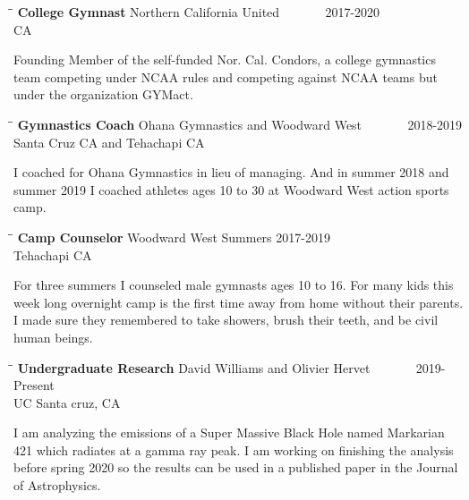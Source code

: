 \documentclass{res}
\begin{document}
\begin{resume}
   \begin{tabbing}
   \hspace{2.3in}\= \hspace{2.6in}\= \kill %
    {\bf College Gymnast} \>Northern California United \> ~~~~~~ 2017-2020\\
                          \>CA
   \end{tabbing}\vspace{-20pt}
    Founding Member of the self-funded Nor. Cal. Condors, a college gymnastics team 			competing under NCAA rules and competing against NCAA teams but under the 					organization GYMact.
    
   \begin{tabbing}%
   \hspace{2.3in}\= \hspace{2.6in}\= \kill %
   {\bf Gymnastics Coach}  \>Ohana Gymnastics and Woodward West \> ~~~~~~ 2018-2019\\
                          \>Santa Cruz CA and Tehachapi CA
   \end{tabbing}\vspace{-20pt}
    I coached for Ohana  Gymnastics in lieu of managing. And in summer 2018 and summer 			2019 I coached athletes ages 10 to 30 at Woodward West action sports camp.   
    
   \begin{tabbing}%
   \hspace{2.3in}\= \hspace{2.6in}\= \kill %
   {\bf Camp Counselor}  \>Woodward West \> Summers 2017-2019\\
                          \>Tehachapi CA
   \end{tabbing}\vspace{-20pt}
    For three summers I counseled male gymnasts ages 10 to 16. For many kids this week 			long overnight camp is the first time away from home without their parents. I made 			sure they remembered to take showers, brush their teeth, and be civil human beings.

\begin{tabbing}%
   \hspace{2.3in}\= \hspace{2.6in}\= \kill %
   {\bf Undergraduate Research}  \>David Williams and Olivier Hervet \> ~~~~~~ 2019-Present\\
                          \>UC Santa cruz, CA
   \end{tabbing}\vspace{-20pt}
   I am analyzing the emissions of a Super Massive Black Hole named Markarian 421 which radiates at a gamma ray peak. I am working on finishing the analysis before spring 2020 so the results can be used in a published paper in the Journal of Astrophysics.




\end{resume}
\end{document}
